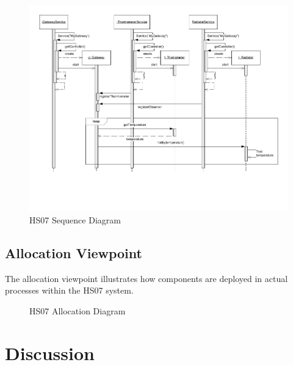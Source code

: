 \documentclass[a4paper,10pt]{article}
\begin{document}
\begin{figure}[!htb]
\includegraphics[angle=90,scale=1.2]{figures/sequence.pdf}
\caption{HS07 Sequence Diagram}
\label{fig:sequence}
\end{figure}
\clearpage


\subsection{Allocation Viewpoint}

The allocation viewpoint illustrates how components are deployed in actual processes
within the HS07 system.

\begin{figure}[!htb]
\caption{HS07 Allocation Diagram}
\label{fig:allocation}
\end{figure}


\section{Discussion}
\end{document}
